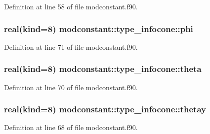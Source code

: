 Definition at line 58 of file modconstant.\+f90.

\subsubsection[{\texorpdfstring{phi}{phi}}]{\setlength{\rightskip}{0pt plus 5cm}real(kind=8) modconstant\+::type\+\_\+infocone\+::phi}\hypertarget{structmodconstant_1_1type__infocone_a6c6e23dca52286e64a2a61931448c936}{}\label{structmodconstant_1_1type__infocone_a6c6e23dca52286e64a2a61931448c936}


Definition at line 71 of file modconstant.\+f90.

\subsubsection[{\texorpdfstring{theta}{theta}}]{\setlength{\rightskip}{0pt plus 5cm}real(kind=8) modconstant\+::type\+\_\+infocone\+::theta}\hypertarget{structmodconstant_1_1type__infocone_ae6f027ed75ab0345c80f6b106d8e98d8}{}\label{structmodconstant_1_1type__infocone_ae6f027ed75ab0345c80f6b106d8e98d8}


Definition at line 70 of file modconstant.\+f90.

\subsubsection[{\texorpdfstring{thetay}{thetay}}]{\setlength{\rightskip}{0pt plus 5cm}real(kind=8) modconstant\+::type\+\_\+infocone\+::thetay}\hypertarget{structmodconstant_1_1type__infocone_ab594a24866362a4d0948fd0eed397651}{}\label{structmodconstant_1_1type__infocone_ab594a24866362a4d0948fd0eed397651}


Definition at line 68 of file modconstant.\+f90.

